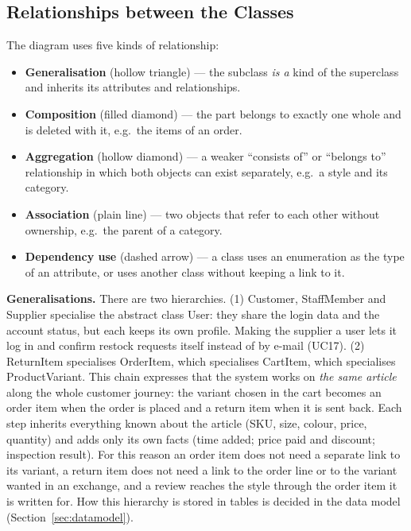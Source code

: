 \subsection{Relationships between the Classes}
\label{subsec:relationships}
The diagram uses five kinds of relationship:
\begin{itemize}
  \item \textbf{Generalisation} (hollow triangle) --- the subclass \emph{is a} kind of the superclass and inherits its attributes and relationships.
  \item \textbf{Composition} (filled diamond) --- the part belongs to exactly one whole and is deleted with it, e.g.\ the items of an order.
  \item \textbf{Aggregation} (hollow diamond) --- a weaker ``consists of'' or ``belongs to'' relationship in which both objects can exist separately, e.g.\ a style and its category.
  \item \textbf{Association} (plain line) --- two objects that refer to each other without ownership, e.g.\ the parent of a category.
  \item \textbf{Dependency \guillemotleft use\guillemotright} (dashed arrow) --- a class uses an enumeration as the type of an attribute, or uses another class without keeping a link to it.
\end{itemize}

\textbf{Generalisations.} There are two hierarchies. (1) \textsf{Customer}, \textsf{StaffMember} and \textsf{Supplier} specialise the abstract class \textsf{User}: they share the login data and the account status, but each keeps its own profile. Making the supplier a user lets it log in and confirm restock requests itself instead of by e-mail (UC17). (2) \textsf{ReturnItem} specialises \textsf{OrderItem}, which specialises \textsf{CartItem}, which specialises \textsf{ProductVariant}. This chain expresses that the system works on \emph{the same article} along the whole customer journey: the variant chosen in the cart becomes an order item when the order is placed and a return item when it is sent back. Each step inherits everything known about the article (SKU, size, colour, price, quantity) and adds only its own facts (time added; price paid and discount; inspection result). For this reason an order item does not need a separate link to its variant, a return item does not need a link to the order line or to the variant wanted in an exchange, and a review reaches the style through the order item it is written for. How this hierarchy is stored in tables is decided in the data model (Section~\ref{sec:datamodel}).

